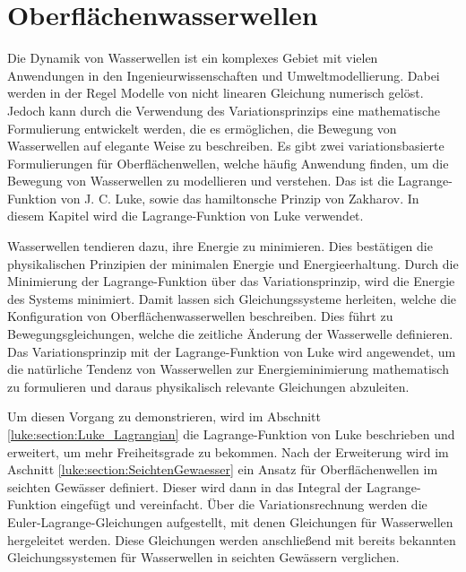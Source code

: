 %
%
%
%
\chapter{Oberflächenwasserwellen\label{chapter:luke}}
\begin{refsection}

Die Dynamik von Wasserwellen ist ein komplexes Gebiet mit vielen Anwendungen in den Ingenieurwissenschaften und Umweltmodellierung.
Dabei werden in der Regel Modelle von nicht linearen Gleichung numerisch gelöst.
Jedoch kann durch die Verwendung des Variationsprinzips eine mathematische Formulierung entwickelt werden, die es ermöglichen, die Bewegung von Wasserwellen auf elegante Weise zu beschreiben.
Es gibt zwei variationsbasierte Formulierungen für Oberflächenwellen, welche häufig Anwendung finden, um die Bewegung von Wasserwellen zu modellieren und verstehen.
Das ist die Lagrange-Funktion von J. C. Luke, sowie das hamiltonsche Prinzip von Zakharov.
In diesem Kapitel wird die Lagrange-Funktion von Luke verwendet.

Wasserwellen tendieren dazu, ihre Energie zu minimieren.
Dies bestätigen die physikalischen Prinzipien der minimalen Energie und Energieerhaltung.
Durch die Minimierung der Lagrange-Funktion über das Variationsprinzip, wird die Energie des Systems minimiert. Damit lassen sich Gleichungssysteme herleiten, welche die Konfiguration von Oberflächenwasserwellen beschreiben.
Dies führt zu Bewegungsgleichungen, welche die zeitliche Änderung der Wasserwelle definieren.
Das Variationsprinzip mit der Lagrange-Funktion von Luke wird angewendet, um die natürliche Tendenz von Wasserwellen zur Energieminimierung mathematisch zu formulieren und daraus physikalisch relevante Gleichungen abzuleiten.

Um diesen Vorgang zu demonstrieren, wird im Abschnitt \ref{luke:section:Luke_Lagrangian} die Lagrange-Funktion von Luke beschrieben und erweitert, um mehr Freiheitsgrade zu bekommen.
Nach der Erweiterung wird im Aschnitt \ref{luke:section:SeichtenGewaesser} ein Ansatz für Oberflächenwellen im seichten Gewässer definiert.
Dieser wird dann in das Integral der Lagrange-Funktion eingefügt und vereinfacht.
Über die Variationsrechnung werden die Euler-Lagrange-Gleichungen aufgestellt, mit denen Gleichungen für Wasserwellen hergeleitet werden.
Diese Gleichungen werden anschließend mit bereits bekannten Gleichungssystemen für Wasserwellen in seichten Gewässern verglichen.




\printbibliography[heading=subbibliography]
\end{refsection}
